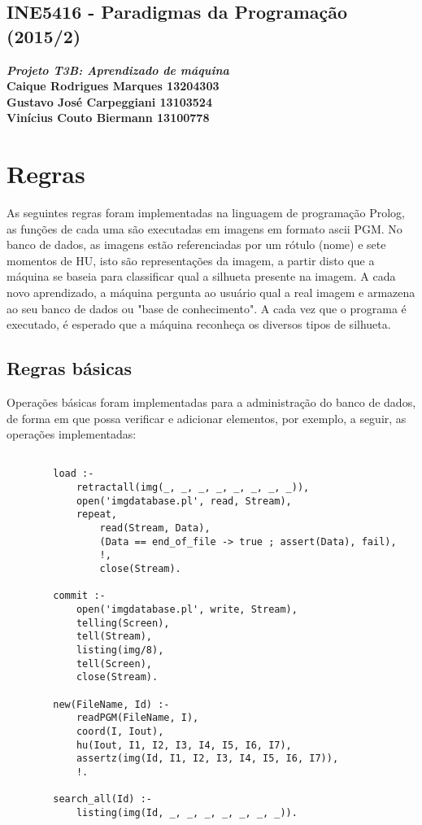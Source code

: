 \documentclass{article}
\begin{document}
\lstset{language=Prolog} %

\begin{center}
    \section*{INE5416 - Paradigmas da Programação (2015/2)}
    \textbf{\textit{Projeto T3B: Aprendizado de máquina} \\
    Caique Rodrigues Marques 13204303 \\
    Gustavo José Carpeggiani 13103524 \\
    Vinícius Couto Biermann  13100778}
\end{center}

\section*{Regras}
    As seguintes regras foram implementadas na linguagem de programação Prolog,
    as funções de cada uma são executadas em imagens em formato ascii PGM. No
    banco de dados, as imagens estão referenciadas por um rótulo (nome) e sete
    momentos de HU, isto são representações da imagem, a partir disto que a
    máquina se baseia para classificar qual a silhueta presente na imagem. A
    cada novo aprendizado, a máquina pergunta ao usuário qual a real imagem e
    armazena ao seu banco de dados ou "base de conhecimento". A cada vez que o
    programa é executado, é esperado que a máquina reconheça os diversos tipos
    de silhueta.
    
    \subsection*{Regras básicas}
        Operações básicas foram implementadas para a administração do banco de
        dados, de forma em que possa verificar e adicionar elementos, por
        exemplo, a seguir, as operações implementadas:
        \begin{lstlisting}[frame=single] % Trecho de código prolog
        
        load :-
            retractall(img(_, _, _, _, _, _, _, _)),
            open('imgdatabase.pl', read, Stream),
            repeat,
                read(Stream, Data),
                (Data == end_of_file -> true ; assert(Data), fail),
                !,
                close(Stream).

        commit :-
            open('imgdatabase.pl', write, Stream),
            telling(Screen),    
            tell(Stream),
            listing(img/8),
            tell(Screen),
            close(Stream).
        
        new(FileName, Id) :-
            readPGM(FileName, I),
            coord(I, Iout),
            hu(Iout, I1, I2, I3, I4, I5, I6, I7),
            assertz(img(Id, I1, I2, I3, I4, I5, I6, I7)),
            !.
        
        search_all(Id) :-
            listing(img(Id, _, _, _, _, _, _, _)).
        \end{lstlisting}
        
\end{document}
